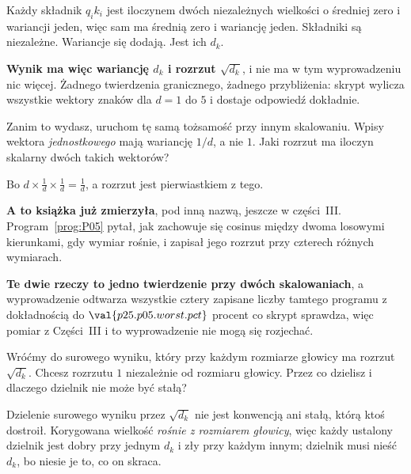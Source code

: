 \begin{fr}

Każdy składnik $q_i k_i$ jest iloczynem dwóch niezależnych wielkości o średniej
zero i wariancji jeden, więc sam ma średnią zero i wariancję jeden. Składniki
są niezależne. Wariancje się dodają. Jest ich $d_k$.

\textbf{Wynik ma więc wariancję $d_k$ i rozrzut $\sqrt{d_k}$}, i nie ma w tym
wyprowadzeniu nic więcej. Żadnego twierdzenia granicznego, żadnego
przybliżenia: skrypt wylicza wszystkie wektory znaków dla $d = 1$ do $5$ i
dostaje odpowiedź dokładnie.

Zanim to wydasz, uruchom tę samą tożsamość przy innym skalowaniu. Wpisy wektora
\emph{jednostkowego} mają wariancję $1/d$, a nie $1$. Jaki rozrzut ma iloczyn
skalarny dwóch takich wektorów?
\dotline
\nextframe
\end{fr}

\begin{fr}

Bo $d \times \frac{1}{d} \times \frac{1}{d} = \frac{1}{d}$, a rozrzut jest
pierwiastkiem z tego.

\textbf{A to książka już zmierzyła}, pod inną nazwą, jeszcze w części~III.
Program~\ref{prog:P05} pytał, jak zachowuje się cosinus między dwoma losowymi
kierunkami, gdy wymiar rośnie, i zapisał jego rozrzut przy czterech różnych
wymiarach.

\textbf{Te dwie rzeczy to jedno twierdzenie przy dwóch skalowaniach}, a
wyprowadzenie odtwarza wszystkie cztery zapisane liczby tamtego programu z
dokładnością do $\val{p25.p05.worst.pct}$ procent \dash{} co skrypt sprawdza,
więc pomiar z Części~III i to wyprowadzenie nie mogą się rozjechać.

Wróćmy do surowego wyniku, który przy każdym rozmiarze głowicy ma rozrzut
$\sqrt{d_k}$. Chcesz rozrzutu $1$ niezależnie od rozmiaru głowicy. Przez co
dzielisz i dlaczego dzielnik nie może być stałą?
\dotline
\nextframe
\end{fr}

\begin{fr}

Dzielenie surowego wyniku przez $\sqrt{d_k}$ nie jest konwencją ani stałą,
którą ktoś dostroił. Korygowana wielkość \emph{rośnie z rozmiarem głowicy},
więc każdy ustalony dzielnik jest dobry przy jednym $d_k$ i zły przy każdym
innym; dzielnik musi nieść $d_k$, bo niesie je to, co on skraca.
\end{fr}

